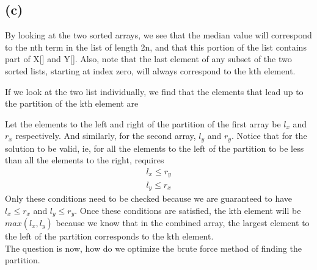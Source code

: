     	\subsection*{(c)}
    		By looking at the two sorted arrays, we see that the median value will correspond to the nth term in the list of length 2n, and that this portion of the list contains part of X[\:] and Y[\:]. Also, note that the last element of any subset of the two sorted lists, starting at index zero, will always correspond to the kth element. \\
    		\begin{center}\leavevmode\vbox{
    			}
    	\end{center}
    	\noindent
    		If we look at the two list individually, we find that the elements that lead up to the partition of the kth element are \\
    		\begin{center}\leavevmode\vbox{
    			}
    	\end{center}
    	\noindent
    	Let the elements to the left and right of the partition of the first array be $l_x$ and $r_x$ respectively. And similarly, for the second array, $l_y$ and $r_y$. Notice that for the solution to be valid, ie, for all the elements to the left of the partition to be less than all the elements to the right, requires
    	\begin{equation*}
    		\begin{split}
    			l_x \leq r_y \\
    			l_y \leq r_x
    		\end{split}
    	\end{equation*}
    	Only these conditions need to be checked because we are guaranteed to have $l_x \leq r_x$ and $l_y \leq r_y$. Once these conditions are satisfied, the kth element will be $max(l_x, l_y)$ because we know that in the combined array, the largest element to the left of the partition corresponds to the kth element.\\
    	
    	The question is now, how do we optimize the brute force method of finding the partition.

